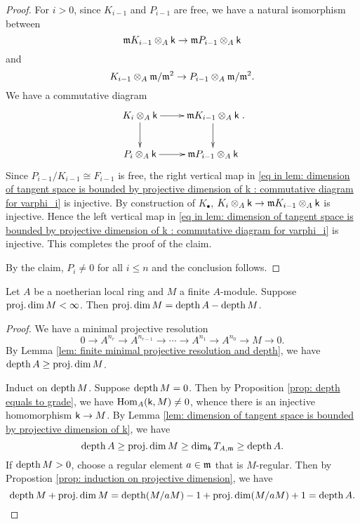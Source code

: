 \begin{proof}
        For \(i > 0\), since \(K_{i-1}\) and \(P_{i-1}\) are free, we have a natural isomorphism between
        \[ {\mathfrak{m}} K_{i-1} \otimes_A {\mathsf{k}}\to {\mathfrak{m}} P_{i-1} \otimes_A {\mathsf{k}} \]
        and 
        \[ K_{i-1} \otimes_A {\mathfrak{m}}/{\mathfrak{m}}^2 \to P_{i-1} \otimes_A {\mathfrak{m}}/{\mathfrak{m}}^2. \]
        We have a commutative diagram
        \begin{equation}\label{eq in lem: dimension of tangent space is bounded by projective dimension of k : commutative diagram for varphi_i}
            \xymatrix{
                K_i \ten_A \kk \ar[r] \ar[d] & \frakm K_{i-1} \ten_A \kk  \ar[d] \\
                P_{i} \ten_A \kk \ar[r] & \frakm P_{i-1} \ten_A \kk
            }. 
        \end{equation}
        Since \(P_{i-1}/K_{i-1} \cong F_{i-1}\) is free, the right vertical map in \eqref{eq in lem: dimension of tangent space is bounded by projective dimension of k : commutative diagram for varphi_i} is injective.
        By construction of \(K_\bullet\), \(K_i \otimes_A {\mathsf{k}} \to {\mathfrak{m}} K_{i-1} \otimes_A {\mathsf{k}}\) is injective.
        Hence the left vertical map in \eqref{eq in lem: dimension of tangent space is bounded by projective dimension of k : commutative diagram for varphi_i} is injective.
        This completes the proof of the claim.

        By the claim, \(P_i \neq 0\) for all \(i \leq n\) and the conclusion follows.
    \end{proof}


    \begin{proposition}\label{prop: Auslander-Buchsbaum formula}
        Let \(A\) be a noetherian local ring and \(M\) a finite \(A\)-module.
        Suppose \(\operatorname{proj.dim} M < \infty\).
        Then \(\operatorname{proj.dim} M = \operatorname{depth} A - \operatorname{depth} M\).
    \end{proposition}
    \begin{proof}
        We have a minimal projective resolution
        \[ 0 \to A^{n_r} \to A^{n_{r-1}} \to \cdots \to A^{n_1} \to A^{n_0} \to M \to 0. \]
        By Lemma \ref{lem: finite minimal projective resolution and depth}, we have \(\operatorname{depth} A \geq \operatorname{proj.dim} M\).

        Induct on \(\operatorname{depth} M\).
        Suppose \(\operatorname{depth} M = 0\).
        Then by Proposition \ref{prop: depth equals to grade}, we have \(\operatorname{Hom}_A({\mathsf{k}},M) \neq 0\), whence there is an injective homomorphism \({\mathsf{k}} \to M\).
        By Lemma \ref{lem: dimension of tangent space is bounded by projective dimension of k}, we have 
        \[ \operatorname{depth} A \geq \operatorname{proj.dim} M \geq \dim_{\mathsf{k}} T_{A,{\mathfrak{m}}} \geq \operatorname{depth} A. \]
        If \(\operatorname{depth} M > 0\), choose a regular element \(a \in {\mathfrak{m}}\) that is \(M\)-regular.
        Then by Propostion \ref{prop: induction on projective dimension}, we have 
        \[ \operatorname{depth} M + \operatorname{proj.dim} M = \operatorname{depth} (M/aM) - 1 + \operatorname{proj.dim} (M/aM) + 1 = \operatorname{depth} A. \]
    \end{proof}

